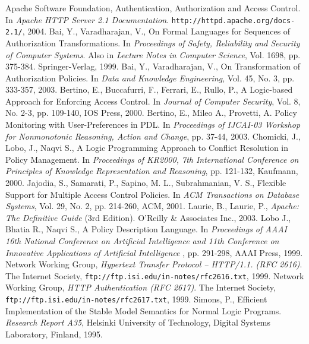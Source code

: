 \documentclass[11pt]{llncs}
\begin{document}
  \begin{thebibliography}{5}
      Apache Software Foundation,
      Authentication, Authorization and Access Control.
      In {\em Apache HTTP Server 2.1 Documentation}.
      {\tt http://httpd.apache.org/docs-2.1/}, 2004.
      Bai, Y., Varadharajan, V.,
      On Formal Languages for Sequences of Authorization Transformations.
      In {\em Proceedings of Safety, Reliability and Security of Computer
      Systems}. Also in {\em Lecture Notes in Computer Science},
      Vol. 1698, pp. 375-384. Springer-Verlag, 1999.
      Bai, Y., Varadharajan, V.,
      On Transformation of Authorization Policies.
      In {\em Data and Knowledge Engineering},
      Vol. 45, No. 3, pp. 333-357, 2003.
      Bertino, E., Buccafurri, F., Ferrari, E., Rullo, P.,
      A Logic-based Approach for Enforcing Access Control.
      In {\em Journal of Computer Security},
      Vol. 8, No. 2-3, pp. 109-140, IOS Press, 2000.
      Bertino, E., Mileo A., Provetti, A.
      Policy Monitoring with User-Preferences in PDL.
      In {\em Proceedings of IJCAI-03 Workshop for Nonmonotonic Reasoning,
      Action and Change},
      pp. 37-44, 2003.
      Chomicki, J., Lobo, J., Naqvi S.,
      A Logic Programming Approach to Conflict Resolution in Policy Management.
      In {\em Proceedings of KR2000, 7th International Conference on Principles
      of Knowledge Representation and Reasoning},
      pp. 121-132, Kaufmann, 2000.
      Jajodia, S., Samarati, P., Sapino, M. L., Subrahmanian, V. S.,
      Flexible Support for Multiple Access Control Policies.
      In {\em ACM Transactions on Database Systems},
      Vol. 29, No. 2, pp. 214-260, ACM, 2001.
      Laurie, B., Laurie, P.,
      {\em Apache: The Definitive Guide} (3rd Edition).
      O'Reilly \& Associates Inc., 2003.
      Lobo J., Bhatia R., Naqvi S.,
      A Policy Description Language.
      In {\em Proceedings of AAAI 16th National Conference on Artificial
      Intelligence and 11th Conference on Innovative Applications of Artificial
      Intelligence },
      pp. 291-298, AAAI Press, 1999.
      Network Working Group,
      {\em Hypertext Transfer Protocol -- HTTP/1.1. (RFC 2616)}.
      The Internet Society,
      {\tt ftp://ftp.isi.edu/in-notes/rfc2616.txt}, 1999.
      Network Working Group,
      {\em HTTP Authentication (RFC 2617)}.
      The Internet Society,
      {\tt ftp://ftp.isi.edu/in-notes/rfc2617.txt}, 1999.
      Simons, P.,
      Efficient Implementation of the Stable Model Semantics for Normal Logic
      Programs.
      {\em Research Report A35},
      Helsinki University of Technology, Digital Systems Laboratory,
      Finland, 1995.
  \end{thebibliography}
\end{document}

